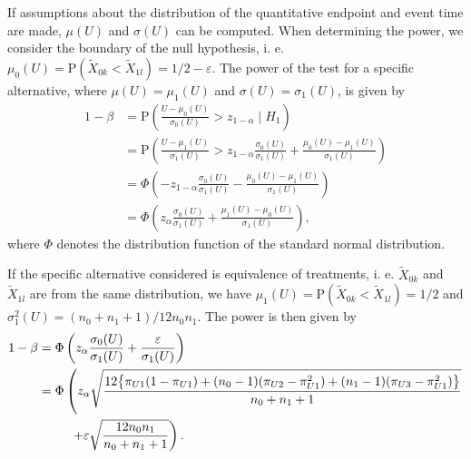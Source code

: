 \documentclass[bimj,fleqn]{w-art}\usepackage[]{graphicx}\usepackage[]{color}
\theoremstyle{plain}
\theoremstyle{definition}
\begin{document}
If assumptions about the distribution of the quantitative endpoint and event time
are made, $\mu(U)$ and $\sigma(U)$ can be computed. When determining the power,
we consider the boundary of the null hypothesis, i. e.
$\mu_0(U) = \text{P}(\widetilde{X}_{0k} < \widetilde{X}_{1l}) = 1/2 - \varepsilon$.
The power of the test for a specific alternative, where $\mu(U) = \mu_1(U)$
and $\sigma(U) = \sigma_1(U)$, is given by
\begin{align*}
  1 - \beta &= \text{P} \left(\frac{U - \mu_0(U)}{\sigma_0(U)}  >
                                 z_{1-\alpha} \mid H_1 \right) \\
            &= \text{P} \left(\frac{U - \mu_1(U)}{\sigma_1(U)}  >
                                 z_{1-\alpha}\frac{\sigma_0(U)}{\sigma_1(U)} +
                                 \frac{\mu_0(U) - \mu_1(U)}{\sigma_1(U)} \right) \\
            &= \Phi\left(- z_{1-\alpha}\frac{\sigma_0(U)}{\sigma_1(U)} -
                            \frac{\mu_0(U) - \mu_1(U)}{\sigma_1(U)} \right) \\
            &= \Phi\left(z_{\alpha}\frac{\sigma_0(U)}{\sigma_1(U)} +
                            \frac{\mu_1(U) - \mu_0(U)}{\sigma_1(U)} \right) ,
\end{align*}
where $\Phi$ denotes the distribution function of the standard normal distribution.

If the specific alternative considered is equivalence of treatments, i. e.
$\widetilde{X}_{0k}$ and $\widetilde{X}_{1l}$ are from the same distribution,
we have $\mu_1(U) = \text{P}(\widetilde{X}_{0k} < \widetilde{X}_{1l}) = 1/2$
and $\sigma^2_1(U) = (n_0 + n_1 +1) /12 n_0 n_1$. The power is
then given by
\begin{align*}
1 - \beta &= \Phi\left(z_{\alpha}\frac{\sigma_0(U)}{\sigma_1(U)} +
                            \frac{\varepsilon}{\sigma_1(U)} \right) \\
          &= \Phi\left(z_{\alpha} \sqrt{\frac{12 \big\{ \pi_{U1} (1 - \pi_{U1}) +
                                  (n_0 - 1) (\pi_{U2} - \pi_{U1}^2) +
                                  (n_1 - 1) (\pi_{U3} - \pi_{U1}^2) \big\}}{n_0 + n_1 +1}} \right.\\
          &{\hphantom{= \Phi\bigg(}} \left. + \varepsilon \sqrt{\frac{12 n_0 n_1 }{n_0 + n_1 +1}} \right) .
\end{align*}
\end{document}
